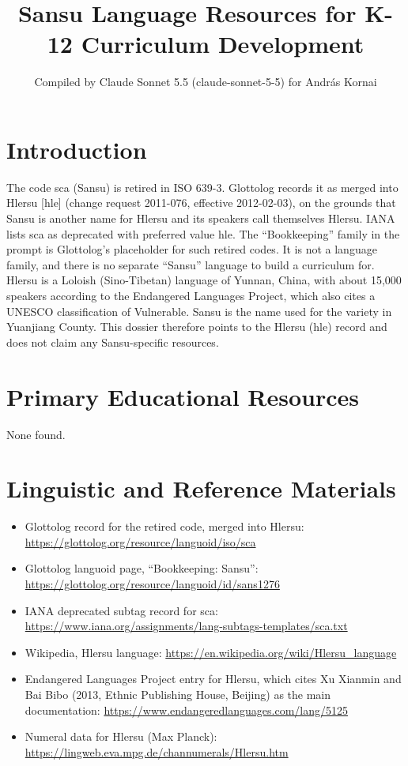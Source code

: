 \documentclass[12pt]{article}
\title{Sansu Language Resources for K-12 Curriculum Development}
\author{Compiled by Claude Sonnet 5.5 (claude-sonnet-5-5) for Andr\'as Kornai}
\date{}
\begin{document}
\maketitle

\section{Introduction}
The code sca (Sansu) is retired in ISO 639-3. Glottolog records it as merged into Hlersu [hle] (change request 2011-076, effective 2012-02-03), on the grounds that Sansu is another name for Hlersu and its speakers call themselves Hlersu. IANA lists sca as deprecated with preferred value hle. The ``Bookkeeping'' family in the prompt is Glottolog's placeholder for such retired codes. It is not a language family, and there is no separate ``Sansu'' language to build a curriculum for. Hlersu is a Loloish (Sino-Tibetan) language of Yunnan, China, with about 15,000 speakers according to the Endangered Languages Project, which also cites a UNESCO classification of Vulnerable. Sansu is the name used for the variety in Yuanjiang County. This dossier therefore points to the Hlersu (hle) record and does not claim any Sansu-specific resources.

\section{Primary Educational Resources}
None found.

\section{Linguistic and Reference Materials}
\begin{itemize}
\item Glottolog record for the retired code, merged into Hlersu: \url{https://glottolog.org/resource/languoid/iso/sca}
\item Glottolog languoid page, ``Bookkeeping: Sansu'': \url{https://glottolog.org/resource/languoid/id/sans1276}
\item IANA deprecated subtag record for sca: \url{https://www.iana.org/assignments/lang-subtags-templates/sca.txt}
\item Wikipedia, Hlersu language: \url{https://en.wikipedia.org/wiki/Hlersu_language}
\item Endangered Languages Project entry for Hlersu, which cites Xu Xianmin and Bai Bibo (2013, Ethnic Publishing House, Beijing) as the main documentation: \url{https://www.endangeredlanguages.com/lang/5125}
\item Numeral data for Hlersu (Max Planck): \url{https://lingweb.eva.mpg.de/channumerals/Hlersu.htm}
\end{itemize}
\end{document}
